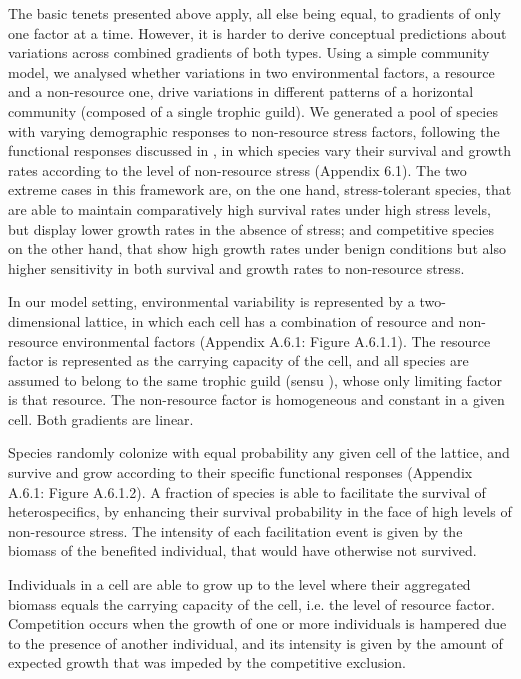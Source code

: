 The basic tenets presented above apply, all else being equal, to gradients of only one factor at a time. However, it is harder to derive conceptual predictions about variations across combined gradients of both types. Using a simple community model, we analysed whether variations in two environmental factors, a resource and a non-resource one, drive variations in different patterns of a horizontal community (composed of a single trophic guild). We generated a pool of species with varying demographic responses to non-resource stress factors, following the functional responses discussed in \cite{Maestre2009}, in which species vary their survival and growth rates according to the level of non-resource stress (Appendix 6.1). The two extreme cases in this framework are, on the one hand, stress-tolerant species, that are able to maintain comparatively high survival rates under high stress levels, but display lower growth rates in the absence of stress; and competitive species on the other hand, that show high growth rates under benign conditions but also higher sensitivity in both survival and growth rates to non-resource stress.

In our model setting, environmental variability is represented by a two-dimensional lattice, in which each cell has a combination of resource and non-resource environmental factors (Appendix A.6.1: Figure A.6.1.1). The resource factor is represented as the carrying capacity of the cell, and all species are assumed to belong to the same trophic guild (sensu \citealt{Fauth1996}), whose only limiting factor is that resource. The non-resource factor is homogeneous and constant in a given cell. Both gradients are linear.

Species randomly colonize with equal probability any given cell of the lattice, and survive and grow according to their specific functional responses (Appendix A.6.1: Figure A.6.1.2). A fraction of species is able to facilitate the survival of heterospecifics, by enhancing their survival probability in the face of high levels of non-resource stress. The intensity of each facilitation event is given by the biomass of the benefited individual, that would have otherwise not survived.

Individuals in a cell are able to grow up to the level where their aggregated biomass equals the carrying capacity of the cell, i.e. the level of resource factor. Competition occurs when the growth of one or more individuals is hampered due to the presence of another individual, and its intensity is given by the amount of expected growth that was impeded by the competitive exclusion.

